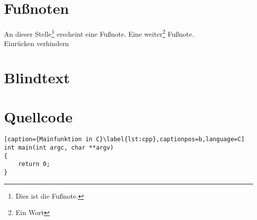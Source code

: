 \section{Fußnoten}
\label{sec:Fussnoten}

An dieser Stelle\footnote{Dies ist die Fußnote.} erscheint eine Fußnote. Eine weiter\footnote{Ein Wort} Fußnote.\\
\noindent
Einrücken verhindern

\section{Blindtext}
\label{sec:Blindtext}

\lipsum[1-2]

\section{Quellcode}
\label{sec:Quellcode}

\begin{lstlisting}[caption={Mainfunktion in C}\label{lst:cpp},captionpos=b,language=C]
int main(int argc, char **argv)
{
	return 0;
}
\end{lstlisting}